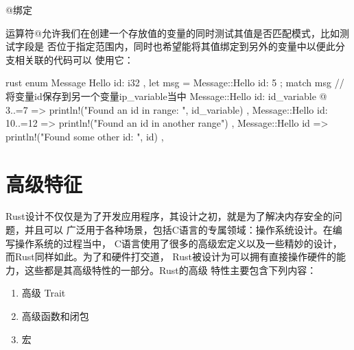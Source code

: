 \begin{outline}[enumerate]
\1 @绑定

运算符@允许我们在创建一个存放值的变量的同时测试其值是否匹配模式，比如测试字段是
否位于指定范围内，同时也希望能将其值绑定到另外的变量中以便此分支相关联的代码可以
使用它：
\begin{code-block}{rust}
enum Message {
    Hello { id: i32 },
}
let msg = Message::Hello { id: 5 };
match msg {
    // 将变量id保存到另一个变量ip_variable当中
    Message::Hello { id: id_variable @ 3..=7 } => {
        println!("Found an id in range: {}", id_variable)
    },
    Message::Hello { id: 10..=12 } => {
        println!("Found an id in another range")
    },
    Message::Hello { id } => {
        println!("Found some other id: {}", id)
    },
}
\end{code-block}
\end{outline}

\section{高级特征}
Rust设计不仅仅是为了开发应用程序，其设计之初，就是为了解决内存安全的问题，并且可以
广泛用于各种场景，包括C语言的专属领域：操作系统设计。在编写操作系统的过程当中，
C语言使用了很多的高级宏定义以及一些精妙的设计，而Rust同样如此。为了和硬件打交道，
Rust被设计为可以拥有直接操作硬件的能力，这些都是其高级特性的一部分。Rust的高级
特性主要包含下列内容：
\begin{enumerate}
  \item 高级 Trait
  \item 高级函数和闭包
  \item 宏
\end{enumerate}


